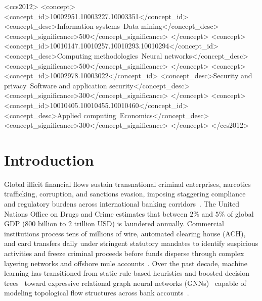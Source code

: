 \documentclass[sigconf,nonacm]{acmart}
\begin{document}
\begin{CCSXML}
<ccs2012>
   <concept>
       <concept_id>10002951.10003227.10003351</concept_id>
       <concept_desc>Information systems~Data mining</concept_desc>
       <concept_significance>500</concept_significance>
   </concept>
   <concept>
       <concept_id>10010147.10010257.10010293.10010294</concept_id>
       <concept_desc>Computing methodologies~Neural networks</concept_desc>
       <concept_significance>500</concept_significance>
   </concept>
   <concept>
       <concept_id>10002978.10003022</concept_id>
       <concept_desc>Security and privacy~Software and application security</concept_desc>
       <concept_significance>300</concept_significance>
   </concept>
   <concept>
       <concept_id>10010405.10010455.10010460</concept_id>
       <concept_desc>Applied computing~Economics</concept_desc>
       <concept_significance>300</concept_significance>
   </concept>
</ccs2012>
\end{CCSXML}



\maketitle

\section{Introduction}
\label{sec:introduction}

Global illicit financial flows sustain transnational criminal enterprises, narcotics trafficking, corruption, and sanctions evasion, imposing staggering compliance and regulatory burdens across international banking corridors~\cite{chainalysis2026crime,ferretti2025aml}. The United Nations Office on Drugs and Crime estimates that between $2\%$ and $5\%$ of global GDP ($800\text{ billion}$ to $2\text{ trillion}$ USD) is laundered annually. Commercial institutions process tens of millions of wire, automated clearing house (ACH), and card transfers daily under stringent statutory mandates to identify suspicious activities and freeze criminal proceeds before funds disperse through complex layering networks and offshore mule accounts~\cite{altman2023ibmaml,eu2024instant}. Over the past decade, machine learning has transitioned from static rule-based heuristics and boosted decision trees~\cite{chen2016xgboost,ke2017lightgbm} toward expressive relational graph neural networks (GNNs)~\cite{kipf2017gcn,hamilton2017sage,velickovic2018gat} capable of modeling topological flow structures across bank accounts~\cite{weber2019elliptic,elmougy2023ellipticpp,egressy2024multigraph,lin2024fraudgt}.
\end{document}
